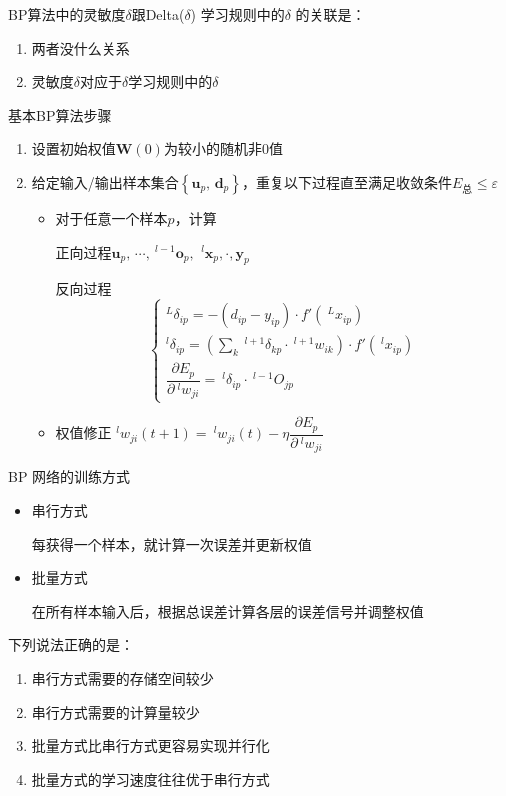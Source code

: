 \begin{example}
    BP算法中的灵敏度$\delta $跟Delta($\delta$) 学习规则中的$\delta$ 的关联是：
    \begin{enumerate}[A]
        \item 两者没什么关系
        \item \textcolor{main1}{灵敏度$\delta$对应于$\delta$学习规则中的$\delta$}
    \end{enumerate}
\end{example}
\begin{example}
    基本BP算法步骤
    \begin{enumerate}
        \item 设置初始权值$\boldsymbol{W}(0)$为较小的随机非0值
        \item 给定输入/输出样本集合$\left\{ \boldsymbol{u}_{p},\,\boldsymbol{d}_{p} \right\}$，重复以下过程直至满足收敛条件$E_{\text{总}}\leq \varepsilon$
        \begin{itemize}
            \item 对于任意一个样本$p$，计算
            
            正向过程$\boldsymbol{u}_p,\,\cdots,\ ^{l-1}\boldsymbol{o}_{p},\,\ ^{l}\boldsymbol{x}_{p},\cdot,\boldsymbol{y}_{p} $

            反向过程
            \[
                \left\{
                    \begin{array}{l}
                        ^{L}\delta_{ip} = -\left( d_{ip}-y_{ip} \right)\cdot f'\left( \ ^{L}x_{ip} \right)\\
                        ^{l}\delta_{ip} = \left( \sum\limits_{k}\ ^{l+1}\delta_{kp}\cdot\ ^{l+1}w_{ik} \right)\cdot f'\left( \ ^{l}x_{ip} \right)\\
                        \dfrac{\partial E_{p}}{\partial\ ^{l}w_{ji}} = \ ^{l}\delta_{ip}\cdot\ ^{l-1}O_{jp}
                    \end{array}
                \right.
            \]
            \item 权值修正 $^{l}w_{ji}(t+1) = \ ^{l}w_{ji}(t)-\eta \dfrac{\partial E_{p}}{\partial\ ^{l}w_{ji}}$
        \end{itemize}
    \end{enumerate}
\end{example}
\begin{note}
    BP 网络的训练方式
    \begin{itemize}
        \item 串行方式
        
        每获得一个样本，就计算一次误差并更新权值
        \item 批量方式
        
        在所有样本输入后，根据总误差计算各层的误差信号并调整权值
    \end{itemize}
\end{note}
\begin{example}
    下列说法正确的是：
    \begin{enumerate}[A]
        \item \textcolor{main1}{串行方式需要的存储空间较少}
        \item 串行方式需要的计算量较少
        \item \textcolor{main1}{批量方式比串行方式更容易实现并行化}
        \item \textcolor{main1}{批量方式的学习速度往往优于串行方式}
    \end{enumerate}
\end{example}

